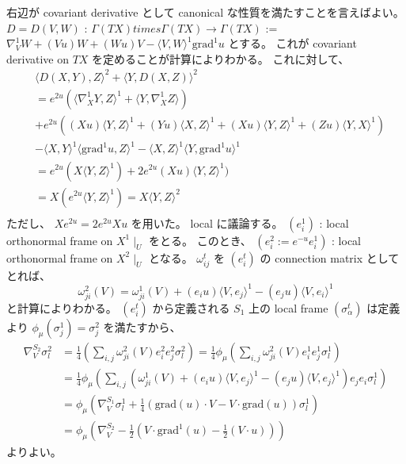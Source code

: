 \begin{Proof}
\itemprof
  右辺が covariant derivative として canonical な性質を満たすことを言えばよい。
  \(D = D(V ,W)\) : \(\Gamma(TX) times \Gamma(TX) \to \Gamma(TX)\) := \(\nabla^1_V W + (V u) W + (W u) V - \langle V , W \rangle^1 \text{grad}^1 u\) とする。
  これが covariant derivative on \(TX\) を定めることが計算によりわかる。
  これに対して、
  \begin{align*}
    & \langle D(X,Y) , Z \rangle^2 + \langle Y , D(X,Z) \rangle^2 \\
    &= e^{2u} (\langle \nabla^1_X Y , Z \rangle^1 + \langle Y , \nabla^1_X Z \rangle) \\
    &+ e^{2u}((X u) \langle Y , Z \rangle^1 + (Y u) \langle X , Z \rangle^1
     + (X u) \langle Y , Z \rangle^1 + (Z u) \langle Y , X \rangle^1) \\
    &- \langle X , Y \rangle^1 \langle \text{grad}^1 u , Z \rangle^1 - \langle X , Z \rangle^1 \langle Y , \text{grad}^1 u \rangle^1 \\
    &= e^{2u}(X \langle Y , Z \rangle^1) + 2 e^{2u} (X u) \langle Y , Z \rangle^1) \\
    &= X (e^{2u} \langle Y , Z \rangle^1) = X \langle Y , Z \rangle^2 \\
  \end{align*}
  ただし、 \(X e^{2u} = 2 e^{2u} X u\) を用いた。
\itemprof
  local に議論する。
  \((e^1_i)\) : local orthonormal frame on \(X^1 \mid_U\) をとる。
  このとき、 \((e^2_i := e^{-u} e^1_i)\) : local orthonormal frame on \(X^2 \mid_U\) となる。
  \(\omega^t_{ij}\) を \((e^t_i)\) の connection matrix としてとれば、
  \[\omega^2_{ji}(V) = \omega^1_{ji}(V) + (e_i u) \langle V , e_j \rangle^1 - (e_j u) \langle V , e_i \rangle^1\]
  と計算によりわかる。
  \((e^t_i)\) から定義される \(S_1\) 上の local frame \((\sigma^t_\alpha)\) は定義より \(\phi_{\mu}(\sigma^1_j) = \sigma^2_j\) を満たすから、
  \begin{align*}
    \nabla^{S_2}_V \sigma^2_l
    &= \frac{1}{4}
    (\sum_{i,j} \omega^2_{ji}(V) e^2_i e^2_j \sigma^2_l)
    = \frac{1}{4} \phi_{\mu} (\sum_{i,j} \omega^2_{ji}(V) e^1_i e^1_j \sigma^1_l) \\
    &= \frac{1}{4} \phi_{\mu}
    (\sum_{i,j}(\omega^1_{ji}(V) + (e_i u) \langle V , e_j \rangle^1 - (e_j u) \langle V , e_j \rangle^1) e_j e_i \sigma^1_l) \\
    &= \phi_{\mu} (\nabla^{S_1}_V \sigma^1_l + \frac{1}{4}(\text{grad}(u) \cdot V - V \cdot \text{grad}(u)) \sigma^1_l) \\
    &= \phi_{\mu} (\nabla^{S_2}_V - \frac{1}{2}(V \cdot \text{grad}^1 (u) - \frac{1}{2}(V \cdot u)))
  \end{align*}
  よりよい。
\itemprof
  \WIP
\end{Proof}
